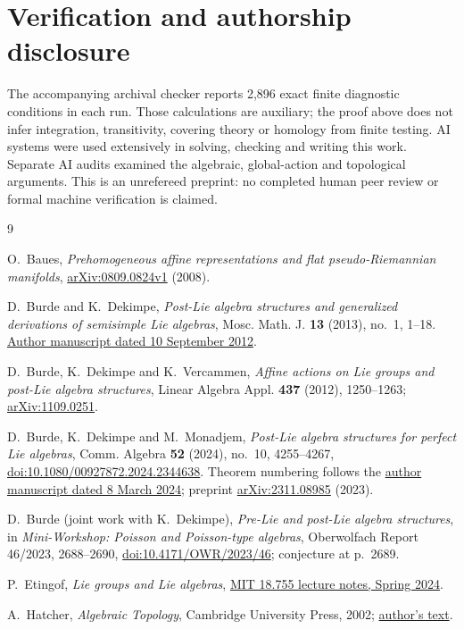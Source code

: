 \documentclass[11pt]{amsart}
\theoremstyle{remark}
\begin{document}
\section*{Verification and authorship disclosure}

The accompanying archival checker reports 2,896 exact finite
diagnostic conditions in each run.  Those calculations are auxiliary;
the proof above does not infer integration, transitivity, covering
theory or homology from finite testing.
AI systems were used extensively in solving, checking and writing
this work.  Separate AI audits examined the algebraic, global-action
and topological arguments.  This is an unrefereed preprint: no
completed human peer review or formal machine verification is claimed.

\begin{thebibliography}{9}

O.~Baues,
\emph{Prehomogeneous affine representations and flat
pseudo-Riemannian manifolds},
\href{https://arxiv.org/abs/0809.0824v1}{arXiv:0809.0824v1} (2008).

D.~Burde and K.~Dekimpe,
\emph{Post-Lie algebra structures and generalized derivations of
semisimple Lie algebras},
Mosc. Math. J. \textbf{13} (2013), no.~1, 1--18.
\href{https://homepage.univie.ac.at/dietrich.burde/papers/burde_44_postlie_der.pdf}
{Author manuscript dated 10 September 2012}.

D.~Burde, K.~Dekimpe and K.~Vercammen,
\emph{Affine actions on Lie groups and post-Lie algebra structures},
Linear Algebra Appl. \textbf{437} (2012), 1250--1263;
\href{https://arxiv.org/abs/1109.0251}{arXiv:1109.0251}.

D.~Burde, K.~Dekimpe and M.~Monadjem,
\emph{Post-Lie algebra structures for perfect Lie algebras},
Comm. Algebra \textbf{52} (2024), no.~10, 4255--4267,
\href{https://doi.org/10.1080/00927872.2024.2344638}
{doi:10.1080/00927872.2024.2344638}.
Theorem numbering follows the
\href{https://homepage.univie.ac.at/dietrich.burde/papers/burde_78_perfect.pdf}
{author manuscript dated 8 March 2024};
preprint \href{https://arxiv.org/abs/2311.08985}{arXiv:2311.08985} (2023).

D.~Burde (joint work with K.~Dekimpe),
\emph{Pre-Lie and post-Lie algebra structures},
in \emph{Mini-Workshop: Poisson and Poisson-type algebras},
Oberwolfach Report 46/2023, 2688--2690,
\href{https://doi.org/10.4171/OWR/2023/46}
{doi:10.4171/OWR/2023/46}; conjecture at p.~2689.

P.~Etingof,
\emph{Lie groups and Lie algebras},
\href{https://ocw.mit.edu/courses/18-755-lie-groups-and-lie-algebras-ii-spring-2024/mit18_755_s24_lec_full.pdf}
{MIT 18.755 lecture notes, Spring 2024}.

A.~Hatcher,
\emph{Algebraic Topology},
Cambridge University Press, 2002;
\href{https://pi.math.cornell.edu/~hatcher/AT/AT.pdf}{author's text}.

\end{thebibliography}
\end{document}
